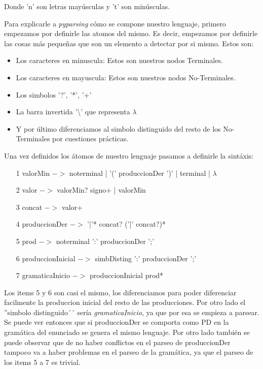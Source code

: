 \documentclass[a4paper]{report}
\begin{document}
Donde 'n' son letras mayúsculas y 't' son minúsculas.



Para explicarle a \emph{pyparsing} cómo se compone nuestro lenguaje, primero empezamos por definirle las atomos del mismo. Es decir, empezamos por definirle las cosas más pequeñas que son un elemento a detectar por si mismo. Estos son:
\begin{itemize}
\item Los caracteres en minuscula: Estos son nuestros nodos Terminales.
\item Los caracteres en mayuscula: Estos son nuestros nodos No-Terminales.
\item Los simbolos '?', '*', '+'
\item La barra invertida '\textbackslash' que representa $\lambda$
\item Y por último diferenciamos al simbolo distinguido del resto de los No-Terminales por cuestiones prácticas.
\end{itemize}



Una vez definidos los átomos de nuestro lenguaje pasamos a definirle la sintáxis:
\begin{itemize}
\item[1] valorMin $->$ noterminal | '(' produccionDer ')' | terminal | $\lambda$
\item[2] valor $->$ valorMin? signo+ | valorMin
\item[3] concat $->$ valor+
\item[4] produccionDer $->$ '|'* concat? ('|' concat?)*
\item[5] prod $->$ noterminal ':' produccionDer ';'
\item[6] produccionInicial $->$ simbDisting ':' produccionDer ';'
\item[7] gramaticaInicio $->$ produccionInicial prod*
\end{itemize}

Los items 5 y 6 son casi el mismo, los diferenciamos para poder diferenciar facilmente la produccion inicial del resto de las producciones. Por otro lado el ''simbolo distinguido´´ sería \emph{gramaticaInicio}, ya que por esa se empieza a parsear. Se puede ver entonces que si produccionDer se comporta como PD en la gramática del enunciado se genera el mismo lenguaje. Por otro lado también se puede observar que de no haber conflictos en el parseo de produccionDer tampoco va a haber problemas en el parseo de la gramática, ya que el parseo de los items 5 a 7 es trivial.
\end{document}
